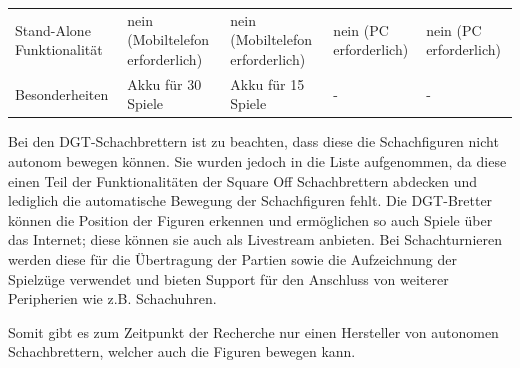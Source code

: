 \begin{longtable}[]{@{}lllll@{}}
\begin{minipage}[t]{0.18\columnwidth}\raggedright
Stand-Alone Funktionalität\strut
\end{minipage} & \begin{minipage}[t]{0.18\columnwidth}\raggedright
nein (Mobiltelefon erforderlich)\strut
\end{minipage} & \begin{minipage}[t]{0.22\columnwidth}\raggedright
nein (Mobiltelefon erforderlich)\strut
\end{minipage} & \begin{minipage}[t]{0.15\columnwidth}\raggedright
nein (PC erforderlich)\strut
\end{minipage} & \begin{minipage}[t]{0.13\columnwidth}\raggedright
nein (PC erforderlich)\strut
\end{minipage}\tabularnewline
\begin{minipage}[t]{0.18\columnwidth}\raggedright
Besonderheiten\strut
\end{minipage} & \begin{minipage}[t]{0.18\columnwidth}\raggedright
Akku für 30 Spiele\strut
\end{minipage} & \begin{minipage}[t]{0.22\columnwidth}\raggedright
Akku für 15 Spiele\strut
\end{minipage} & \begin{minipage}[t]{0.15\columnwidth}\raggedright
-\strut
\end{minipage} & \begin{minipage}[t]{0.13\columnwidth}\raggedright
-\strut
\end{minipage}\tabularnewline
\bottomrule
\end{longtable}

Bei den DGT-Schachbrettern ist zu beachten, dass diese die Schachfiguren
nicht autonom bewegen können. Sie wurden jedoch in die Liste
aufgenommen, da diese einen Teil der Funktionalitäten der Square Off
Schachbrettern abdecken und lediglich die automatische Bewegung der
Schachfiguren fehlt. Die DGT-Bretter können die Position der Figuren
erkennen und ermöglichen so auch Spiele über das Internet; diese können
sie auch als Livestream anbieten. Bei Schachturnieren werden diese für
die Übertragung der Partien sowie die Aufzeichnung der Spielzüge
verwendet und bieten Support für den Anschluss von weiterer Peripherien
wie z.B. Schachuhren.

Somit gibt es zum Zeitpunkt der Recherche nur einen Hersteller von
autonomen Schachbrettern, welcher auch die Figuren bewegen kann.

